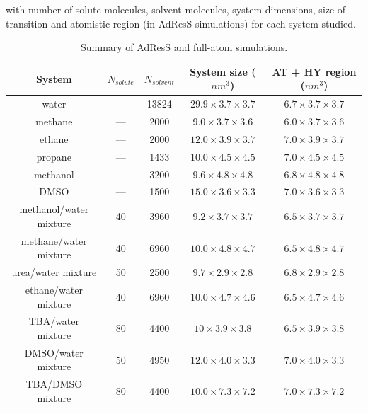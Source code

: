 \documentclass[a4paper,preprint,unsortedaddress]{revtex4-1}
\begin{document}
with number of solute molecules, solvent molecules, system dimensions, size of transition and atomistic region (in AdResS simulations)
for each system studied. 
\begin{table}[!ht]
\begin{center}
\begin{tabular}{ccccc}
\hline \hline
 System & $N_{solute}$ & $N_{solvent}$ & System size ($nm^{3}$) &  AT + HY region ($nm^{3}$)  \\
\hline
water    & --- & 13824 & $29.9 \times 3.7 \times 3.7$ & $6.7 \times 3.7 \times 3.7$ \\
methane & --- & 2000 & $9.0 \times  3.7 \times 3.6$ & $6.0 \times 3.7 \times 3.6$ \\
ethane & --- & 2000 & $12.0 \times 3.9 \times 3.7$ & $7.0 \times 3.9 \times 3.7$ \\
propane & --- & 1433 & $10.0 \times 4.5 \times 4.5$ & $7.0 \times 4.5 \times 4.5$ \\
methanol & --- & 3200 & $9.6 \times 4.8 \times 4.8$ & $6.8 \times 4.8 \times 4.8$ \\
DMSO & --- & 1500 & $15.0 \times 3.6 \times 3.3$ &  $7.0 \times 3.6 \times 3.3$ \\
methanol/water mixture & 40 & 3960 & $9.2 \times 3.7 \times 3.7$ & $6.5 \times 3.7 \times 3.7$ \\
methane/water mixture & 40  & 6960 & $10.0 \times 4.8 \times 4.7$ & $6.5 \times 4.8 \times 4.7$ \\
urea/water mixture & 50 & 2500 & $9.7 \times 2.9 \times 2.8$ & $6.8 \times 2.9 \times 2.8$ \\
ethane/water mixture & 40 & 6960 & $10.0 \times 4.7 \times 4.6$ & $6.5 \times 4.7 \times 4.6$ \\ 
TBA/water mixture & 80 & 4400 & $10 \times 3.9 \times 3.8$ & $6.5 \times 3.9 \times 3.8$  \\
DMSO/water mixture & 50 & 4950 & $12.0 \times 4.0 \times 3.3$ & $7.0 \times 4.0 \times 3.3$ \\
TBA/DMSO mixture & 80 & 4400 & $10.0 \times 7.3 \times 7.2$ &  $7.0 \times 7.3 \times 7.2$ \\
\hline \hline
\end{tabular}
\caption{Summary of AdResS and full-atom simulations.}
\label{table2}
\end{center}
\end{table}
\end{document}
